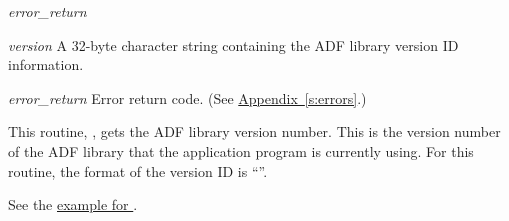 \begin{Ventryi}{\textit{error\_return}}
\item[\textit{version}]
     A 32-byte character string containing the ADF library version ID
     information.
\item[\textit{error\_return}]
     Error return code.
     (See \hyperref[s:errors]{Appendix~\ref*{s:errors}}.)
\end{Ventryi}

This routine, , gets the ADF library version
number.
This is the version number of the ADF library that the application
program is currently using.
For this routine, the format of the version ID is ``''.

\Example

See the \hyperlink{ex:Database\_Version}{example for
}.

